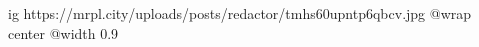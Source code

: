  
 
 
 
 

\ifcmt
  ig https://mrpl.city/uploads/posts/redactor/tmhs60upntp6qbcv.jpg
  @wrap center
  @width 0.9
\fi
